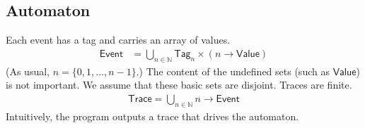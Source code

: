 \documentclass[preprint]{sigplanconf} %
\newcommand{\N}{\ensuremath{\mathbb{N}}}
\newcommand{\set}[1]{\ensuremath{\mathsf{#1}}}
\theoremstyle{definition}
\begin{document}
\subsection{Automaton} %

Each event has a tag and carries an array of values.
\begin{align}
\set{Event}&=\bigcup_{n\in\N}\set{Tag}_n\times(n\to\set{Value})
\end{align}
(As usual, $n=\{0,1,\ldots,n-1\}$.)
The content of the undefined sets (such as \set{Value}) is not important.
We assume that these basic sets are disjoint.
Traces are finite.
\begin{align}
\set{Trace}=\bigcup_{n\in\N} n\to\set{Event}
\end{align}
Intuitively, the program outputs a trace that drives the automaton.
\end{document}
